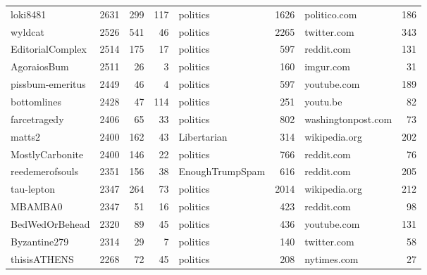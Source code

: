 \begin{tabular}{lrrrlrlr}
loki8481          &  2631 &         299 &         117 &         politics &      1626 &           politico.com &       186 \\
wyldcat           &  2526 &         541 &          46 &         politics &      2265 &            twitter.com &       343 \\
EditorialComplex  &  2514 &         175 &          17 &         politics &       597 &             reddit.com &       131 \\
AgoraiosBum       &  2511 &          26 &           3 &         politics &       160 &              imgur.com &        31 \\
pissbum-emeritus  &  2449 &          46 &           4 &         politics &       597 &            youtube.com &       189 \\
bottomlines       &  2428 &          47 &         114 &         politics &       251 &               youtu.be &        82 \\
farcetragedy      &  2406 &          65 &          33 &         politics &       802 &     washingtonpost.com &        73 \\
matts2            &  2400 &         162 &          43 &      Libertarian &       314 &          wikipedia.org &       202 \\
MostlyCarbonite   &  2400 &         146 &          22 &         politics &       766 &             reddit.com &        76 \\
reedemerofsouls   &  2351 &         156 &          38 &  EnoughTrumpSpam &       616 &             reddit.com &       205 \\
tau-lepton        &  2347 &         264 &          73 &         politics &      2014 &          wikipedia.org &       212 \\
MBAMBA0           &  2347 &          51 &          16 &         politics &       423 &             reddit.com &        98 \\
BedWedOrBehead    &  2320 &          89 &          45 &         politics &       436 &            youtube.com &       131 \\
Byzantine279      &  2314 &          29 &           7 &         politics &       140 &            twitter.com &        58 \\
thisisATHENS      &  2268 &          72 &          45 &         politics &       208 &            nytimes.com &        27 \\
\bottomrule
\end{tabular}
